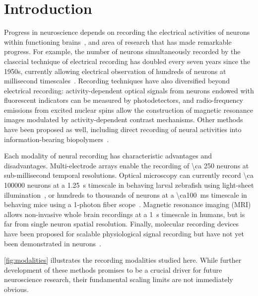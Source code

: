 \section{Introduction}
Progress in neuroscience depends on recording the electrical activities of neurons within functioning brains~\cite{alivisatos2012brain, bansal2012decoding}, and area of research that has made remarkable progress. For example, the number of neurons simultaneously recorded by the clasccial technique of electrical recording has doubled every seven years since the 1950s, currently allowing electrical observation of hundreds of neurons at millisecond timescales~\cite{stevenson11}. Recording techniques have also diversified beyond electrical recording: activity-dependent optical signals from neurons endowed with fluorescent indicators can be measured by photodetectors, and radio-frequency emissions from excited nuclear spins allow the construction of magnetic resonance images modulated by activity-dependent contrast mechanisms.
Other methods have been proposed as well, including direct recording of neural activities into information-bearing biopolymers~\cite{zamft12,glaser13,kording11a}.

Each modality of neural recording has characteristic advantages and disadvantages.
Multi-electrode arrays enable the recording of \num{\ca 250} neurons at sub-millisecond temporal resolutions.
Optical microscopy can currently record \num{\ca 100000} neurons at a \SI{1.25}{\second} timescale in behaving larval zebrafish using light-sheet illumination~\cite{ahrens13}, or hundreds to thousands of neurons at a \SI{\ca100}{\milli\second} timescale in behaving mice using a 1-photon fiber scope~\cite{ziv13}.
Magnetic resonance imaging (MRI) allows non-invasive whole brain recordings at a \SI{1}{\second} timescale in humans, but is far from single neuron spatial resolution.
Finally, molecular recording devices have been proposed for scalable physiological signal recording but have not yet been demonstrated in neurons~\cite{zamft12,glaser13,kording11a}.

\autoref{fig:modalities} illustrates the recording modalities studied here.
While further development of these methods promises to be a crucial driver for future neuroscience research, their fundamental scaling limits are not immediately obvious.

